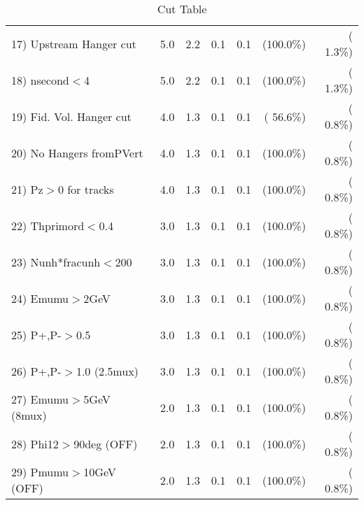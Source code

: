 \begin{table}[h!]
\begin{tabular}{||l||r|r|r|r|r|r||}
 17) Upstream Hanger cut  &          5.0 &          2.2 &          0.1 &          0.1 & (100.0\%) & (  1.3\%) \\
 18) nsecond$<$4          &          5.0 &          2.2 &          0.1 &          0.1 & (100.0\%) & (  1.3\%) \\
 19) Fid. Vol. Hanger cut &          4.0 &          1.3 &          0.1 &          0.1 & ( 56.6\%) & (  0.8\%) \\
 20) No Hangers fromPVert &          4.0 &          1.3 &          0.1 &          0.1 & (100.0\%) & (  0.8\%) \\
 21) Pz$>$0 for tracks    &          4.0 &          1.3 &          0.1 &          0.1 & (100.0\%) & (  0.8\%) \\
 22) Thprimord$<$0.4      &          3.0 &          1.3 &          0.1 &          0.1 & (100.0\%) & (  0.8\%) \\
 23) Nunh*fracunh$<$200   &          3.0 &          1.3 &          0.1 &          0.1 & (100.0\%) & (  0.8\%) \\
 24) Emumu$>$2GeV         &          3.0 &          1.3 &          0.1 &          0.1 & (100.0\%) & (  0.8\%) \\
 25) P+,P-$>$0.5          &          3.0 &          1.3 &          0.1 &          0.1 & (100.0\%) & (  0.8\%) \\
 26) P+,P-$>$1.0 (2.5mux) &          3.0 &          1.3 &          0.1 &          0.1 & (100.0\%) & (  0.8\%) \\
 27) Emumu$>$5GeV  (8mux) &          2.0 &          1.3 &          0.1 &          0.1 & (100.0\%) & (  0.8\%) \\
 28) Phi12$>$90deg  (OFF) &          2.0 &          1.3 &          0.1 &          0.1 & (100.0\%) & (  0.8\%) \\
 29) Pmumu$>$10GeV  (OFF) &          2.0 &          1.3 &          0.1 &          0.1 & (100.0\%) & (  0.8\%) \\
 \hline
 \hline
 \end{tabular}
 \caption{Cut Table           }
 \label{tab-cutcohjpsi-mumu_cohphi0}
 \end{table}
